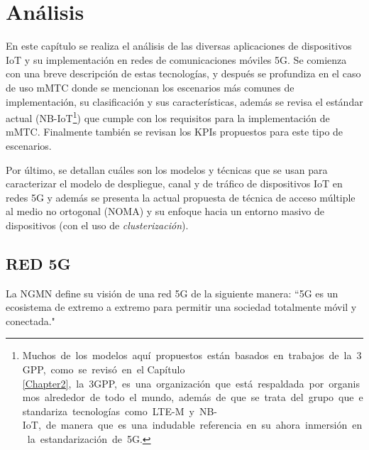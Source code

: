 
\chapter{Análisis} %


\label{Chapter4} %

En este capítulo se realiza el análisis de las diversas aplicaciones de dispositivos IoT y su implementación en redes de comunicaciones móviles 5G. Se comienza con una breve descripción de estas tecnologías, y después se profundiza en el caso de uso mMTC donde se mencionan los escenarios más comunes de implementación, su clasificación y sus características, además se revisa el estándar actual (NB-IoT\footnote{ Muchos\ de\ los\ modelos\ aqu\textrm{í}\ propuestos\ est\textrm{á}n\ basados\ en\ trabajos\ de\ la\ 3GPP,\ como\ se\ revis\textrm{ó}\ en\ el Capítulo \ref{Chapter2},\ la\ 3GPP,\ es\ una\ organizaci\textrm{ó}n\ que\ est\textrm{á}\ respaldada\ por\ organismos\ alrededor\ de\ todo\ el\ mundo,\ adem\textrm{á}s\ de\ que\ se\ trata\ del\ grupo\ que\ estandariza\ tecnolog\textrm{í}as\ como\ LTE-M\ y\ NB-IoT,\ de\ manera\ que\ es\ una\ indudable\ referencia\ en\ su\ ahora\ inmersi\textrm{ó}n\ en\ la\ estandarizaci\textrm{ó}n\ de\ 5G.}) que cumple con los requisitos para la implementación de mMTC. Finalmente también se revisan los KPIs propuestos para este tipo de escenarios.\newline

Por último, se detallan cuáles son los modelos y técnicas que se usan para caracterizar el modelo de despliegue, canal y de tráfico de dispositivos IoT en redes 5G y además se presenta la actual propuesta de técnica de acceso múltiple al medio no ortogonal (NOMA) y su enfoque hacia un entorno masivo de dispositivos (con el uso de \textit{clusterización}).



\section{RED 5G}

La NGMN define su visión de una red 5G de la siguiente manera: ``5G es un ecosistema de extremo a extremo para permitir una sociedad totalmente móvil y conectada."\newline

